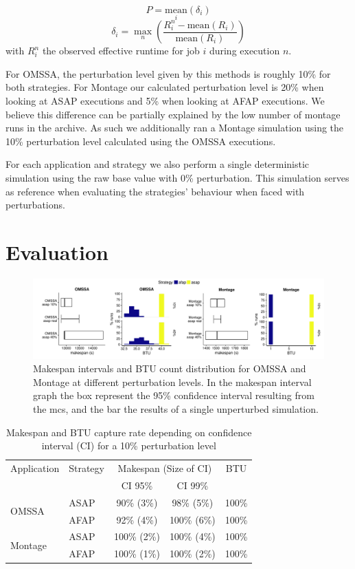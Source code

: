 \documentclass[10pt,conference,compsocconf]{IEEEtran}
\begin{document}
\[P = \underset{i}{\textrm{mean}}(\delta{}_i)\]
\[\delta{}_i = \max_n\left(\frac{R_i^n-\textrm{mean}(R_i)}{\textrm{mean}(R_i)}\right)\]
with $R_i^n$ the observed effective runtime for job $i$ during execution $n$. 

For OMSSA, the perturbation level given by this methods is roughly 10\% for both
strategies. For Montage  our calculated perturbation level is  20\% when looking
at ASAP  executions and  5\% when  looking at AFAP  executions. We  believe this
difference can be partially  explained by the low number of  montage runs in the
archive. As such we additionally ran a Montage simulation using the 10\% 
perturbation level calculated using the OMSSA executions.

For  each  application and  strategy  we  also  perform a  single  deterministic
simulation  using the  raw base  value  with 0\%  perturbation. This  simulation
serves as  reference when  evaluating the strategies' behaviour when  faced with
perturbations.

\section{Evaluation}
\label{sec:eval}

\begin{figure}
	\includegraphics[width=\textwidth]{gfx/int_plot.pdf}
	\caption{Makespan intervals and BTU count distribution for OMSSA and 
	Montage at different perturbation levels. In the makespan interval graph 
	the box represent the 95\% confidence interval resulting from the \acs{mcs},
	and the bar the results of a single unperturbed simulation.}\label{fig:int}
\end{figure}

\begin{table}
	\centering
	\caption{Makespan and BTU capture rate depending on confidence interval
          (CI) for a 10\% perturbation level}\label{tab:fit}
	\begin{tabular}{llccc}
		\toprule
		Application&Strategy&\multicolumn{2}{c}{Makespan (Size of CI)}&BTU\\
                           &         & CI 95\% & CI 99\% &\\
		\midrule
		\multirow{2}{*}{OMSSA}&ASAP&  90\% (3\%)&  98\% (5\%)& 100\%\\
				      &AFAP&  92\% (4\%)& 100\% (6\%)& 100\%\\
		\midrule
		\multirow{2}{*}{Montage}&ASAP& 100\% (2\%)& 100\% (4\%)& 100\%\\
					&AFAP& 100\% (1\%)& 100\% (2\%)& 100\%\\
		\bottomrule
	\end{tabular}
\end{table}
\end{document}
